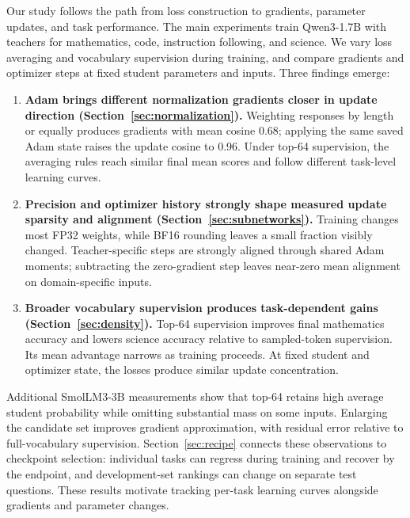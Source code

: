 Our study follows the path from loss construction to gradients, parameter updates, and task performance. The main experiments train Qwen3-1.7B with teachers for mathematics, code, instruction following, and science. We vary loss averaging and vocabulary supervision during training, and compare gradients and optimizer steps at fixed student parameters and inputs. Three findings emerge:
\begin{enumerate}
\item \textbf{Adam brings different normalization gradients closer in update direction (Section~\ref{sec:normalization}).}
Weighting responses by length or equally produces gradients with mean cosine 0.68; applying the same saved Adam state raises the update cosine to 0.96. Under top-64 supervision, the averaging rules reach similar final mean scores and follow different task-level learning curves.
\item \textbf{Precision and optimizer history strongly shape measured update sparsity and alignment (Section~\ref{sec:subnetworks}).}
Training changes most FP32 weights, while BF16 rounding leaves a small fraction visibly changed. Teacher-specific steps are strongly aligned through shared Adam moments; subtracting the zero-gradient step leaves near-zero mean alignment on domain-specific inputs.
\item \textbf{Broader vocabulary supervision produces task-dependent gains (Section~\ref{sec:density}).}
Top-64 supervision improves final mathematics accuracy and lowers science accuracy relative to sampled-token supervision. Its mean advantage narrows as training proceeds. At fixed student and optimizer state, the losses produce similar update concentration.
\end{enumerate}

Additional SmolLM3-3B measurements show that top-64 retains high average student probability while omitting substantial mass on some inputs. Enlarging the candidate set improves gradient approximation, with residual error relative to full-vocabulary supervision. Section~\ref{sec:recipe} connects these observations to checkpoint selection: individual tasks can regress during training and recover by the endpoint, and development-set rankings can change on separate test questions. These results motivate tracking per-task learning curves alongside gradients and parameter changes.

